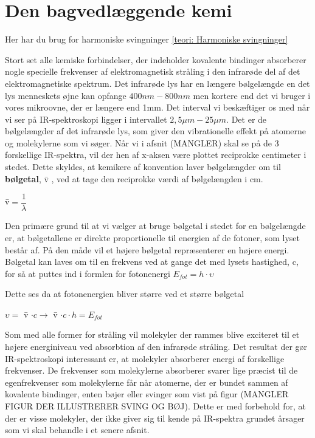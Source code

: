 \section{Den bagvedlæggende kemi}

Her har du brug for harmoniske svingninger \ref{teori: Harmoniske svingninger}

Stort set alle kemiske forbindelser, der indeholder kovalente bindinger absorberer nogle specielle frekvenser af elektromagnetisk stråling i den infrarøde del af det elektromagnetiske spektrum. Det infrarøde lys har en længere bølgelængde en det lys menneskets øjne kan opfange $400nm - 800nm$ men kortere end det vi bruger i vores mikroovne, der er længere end 1mm. Det interval vi beskæftiger os med når vi ser på IR-spektroskopi ligger i intervallet $2,5 \mu m- 25 \mu m $. Det er de bølgelængder af det infrarøde lys, som giver den vibrationelle effekt på atomerne og molekylerne som vi søger. Når vi i afsnit (MANGLER) skal se på de 3 forskellige IR-spektra, vil der hen af x-aksen være plottet reciprokke centimeter i stedet. Dette skyldes, at kemikere af konvention laver bølgelængder om til \textbf{bølgetal}, \={v} , ved at tage den reciprokke værdi af bølgelængden i cm. 

\begin{center}
\={v}$= \dfrac{1}{\lambda}$
\end{center}

Den primære grund til at vi vælger at bruge bølgetal i stedet for en bølgelængde er, at bølgetallene er direkte proportionelle til energien af de fotoner, som lyset består af. På den måde vil et højere bølgetal repræsenterer en højere energi. Bølgetal kan laves om til en frekvens ved at gange det med lysets hastighed, c, for så at puttes ind i formlen for fotonenergi $E_{fot} = h \cdot \upsilon$

Dette ses da at fotonenergien bliver større ved et større bølgetal 
\\

\begin{center}
$\upsilon =$ \={v} $\cdot c \rightarrow$ \={v} $\cdot c \cdot h = E_{fot}$
\end{center}

Som med alle former for stråling vil molekyler der rammes blive exciteret til et højere energiniveau ved absorbtion af den infrarøde stråling. Det resultat der gør IR-spektroskopi interessant er, at molekyler absorberer energi af forskellige frekvenser. De frekvenser som molekylerne absorberer svarer lige præcist til de egenfrekvenser som molekylerne får når atomerne, der er bundet sammen af  kovalente bindinger, enten bøjer eller svinger som vist på figur (MANGLER FIGUR DER ILLUSTRERER SVING OG BØJ). Dette er med forbehold for, at der er visse molekyler, der ikke giver sig til kende på IR-spektra grundet årsager som vi skal behandle i et senere afsnit. 
\\

